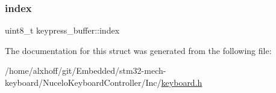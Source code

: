 \mbox{\label{structkeypress__buffer_aa65a87852d890d7f8068122b36205e2d}} 
\subsubsection{\texorpdfstring{index}{index}}
{\footnotesize\ttfamily uint8\+\_\+t keypress\+\_\+buffer\+::index}



The documentation for this struct was generated from the following file\+:\begin{DoxyCompactItemize}
\item 
/home/alxhoff/git/\+Embedded/stm32-\/mech-\/keyboard/\+Nucelo\+Keyboard\+Controller/\+Inc/\hyperlink{keyboard_8h}{keyboard.\+h}\end{DoxyCompactItemize}
